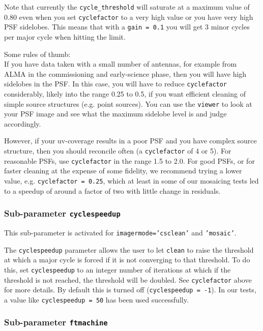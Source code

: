 Note that currently the {\tt cycle\_threshold} will saturate at a
maximum value of 0.80 even when you set {\tt cyclefactor} to a very
high value or you have very high PSF sidelobes.  This means that with
a {\tt gain = 0.1} you will get 3 minor cycles per major cycle when
hitting the limit.

\noindent Some rules of thumb:\\

If you have data taken with a small number of antennas, for example
from ALMA in the commissioning and early-science phase, then you will
have high sidelobes in the PSF.  In this case, you will have to reduce
{\tt cyclefactor} considerably, likely into the range 0.25 to 0.5,
if you want efficient cleaning of simple source structures (e.g. point
sources).  You can use the {\tt viewer} to look at your PSF image
and see what the maximum sidelobe level is and judge accordingly.

However, if your uv-coverage results in a poor PSF and you have
complex source structure, then you should reconcile often (a
{\tt cyclefactor} of 4 or 5). For reasonable PSFs, use
{\tt cyclefactor} in the range 1.5 to 2.0. For good PSFs, or for
faster cleaning at the expense of some fidelity, we recommend trying a
lower value, e.g. {\tt cyclefactor = 0.25}, which at least in some
of our mosaicing tests led to a speedup of around a factor of two with
little change in residuals. 

\subsubsection{Sub-parameter {\tt cyclespeedup} }
\label{section:im.clean.imagermode.cyclespeedup}

This sub-parameter is activated for {\tt imagermode='csclean'} and
{\tt 'mosaic'}.

The {\tt cyclespeedup} parameter allows the user to let {\tt clean}
to raise the threshold at which a major cycle is forced if it is not
converging to that threshold.  To do this, set {\tt cyclespeedup} to
an integer number of iterations at which if the threshold is not reached,
the threshold will be doubled.  See {\tt cyclefactor} above for more
details.  By default this is turned off ({\tt cyclespeedup = -1}).
In our tests, a value like {\tt cyclespeedup = 50} has been used successfully.

\subsubsection{Sub-parameter {\tt ftmachine} }
\label{section:im.imagermode.mosaic.ftmachine}

